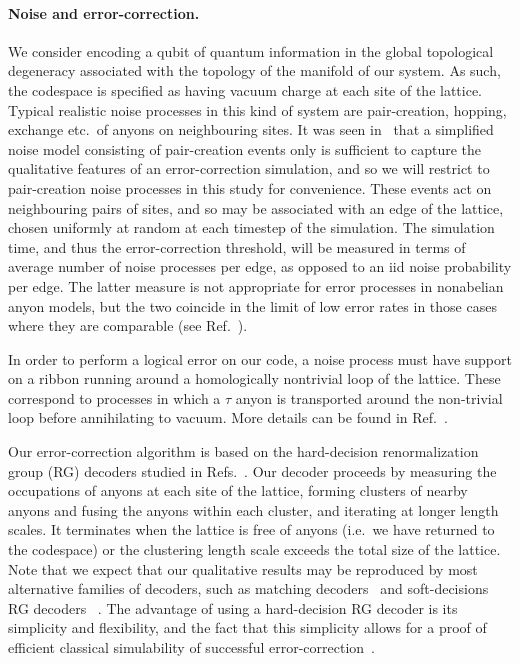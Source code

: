 \documentclass[aps, prl, letterpaper, twocolumn, superscriptaddress, notitlepage, 10pt]{revtex4-1}
\begin{document}
\paragraph{Noise and error-correction.}

	We consider encoding a qubit of quantum information in the global topological degeneracy associated with the topology of the manifold of our system. As such, the codespace is specified as having vacuum charge at each site of the lattice. Typical realistic noise processes in this kind of system are pair-creation, hopping, exchange etc.~of anyons on neighbouring sites. It was seen in~\cite{Brell2013} that a simplified noise model consisting of pair-creation events only is sufficient to capture the qualitative features of an error-correction simulation, and so we will restrict to pair-creation noise processes in this study for convenience. These events act on neighbouring pairs of sites, and so may be associated with an edge of the lattice, chosen uniformly at random at each timestep of the simulation. The simulation time, and thus the error-correction threshold, will be measured in terms of average number of noise processes per edge, as opposed to an iid noise probability per edge. The latter measure is not appropriate for error processes in nonabelian anyon models, but the two coincide in the limit of low error rates in those cases where they are comparable (see Ref.~\cite{Brell2013}).

	In order to perform a logical error on our code, a noise process must have support on a ribbon running around a homologically nontrivial loop of the lattice. These correspond to processes in which a $\tau$ anyon is transported around the non-trivial loop before annihilating to vacuum. More details can be found in Ref.~\cite{?}.

	Our error-correction algorithm is based on the hard-decision renormalization group (RG) decoders studied in Refs.~\cite{?}. Our decoder proceeds by measuring the occupations of anyons at each site of the lattice, forming clusters of nearby anyons and fusing the anyons within each cluster, and iterating at longer length scales. It terminates when the lattice is free of anyons (i.e.~we have returned to the codespace) or the clustering length scale exceeds the total size of the lattice.   Note that we expect that our qualitative results may be reproduced by most alternative families of decoders, such as matching decoders~\cite{?} and soft-decisions RG decoders~\cite{?} . The advantage of using a hard-decision RG decoder is its simplicity and flexibility, and the fact that this simplicity allows for a proof of efficient classical simulability of successful error-correction~\cite{RGsim}.
\end{document}
